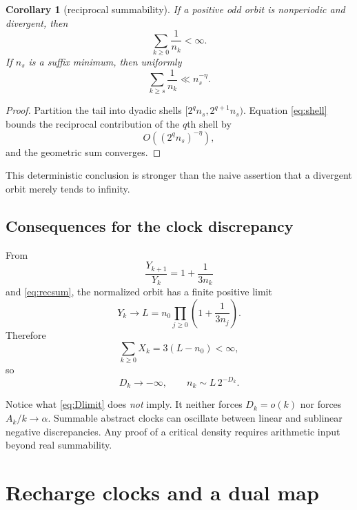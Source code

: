 \documentclass[11pt,reqno]{amsart}
\theoremstyle{plain}
\newtheorem{corollary}[theorem]{Corollary}
\theoremstyle{definition}
\numberwithin{equation}{section}
\begin{document}
\begin{corollary}[reciprocal summability]
\label{cor:reciprocal}
If a positive odd orbit is nonperiodic and divergent, then
\begin{equation}\label{eq:recsum}
\sum_{k\ge0}\frac1{n_k}<\infty.
\end{equation}
If $n_s$ is a suffix minimum, then uniformly
\begin{equation}\label{eq:recsuffix}
\sum_{k\ge s}\frac1{n_k}\ll n_s^{-\eta}.
\end{equation}
\end{corollary}

\begin{proof}
Partition the tail into dyadic shells $[2^qn_s,2^{q+1}n_s)$.  Equation
\eqref{eq:shell} bounds the reciprocal contribution of the $q$th shell by
\[
O\!\left((2^qn_s)^{-\eta}\right),
\]
and the geometric sum converges.
\end{proof}

This deterministic conclusion is stronger than the naive assertion that a
divergent orbit merely tends to infinity.

\subsection{Consequences for the clock discrepancy}

From
\[
\frac{Y_{k+1}}{Y_k}=1+\frac1{3n_k}
\]
and \eqref{eq:recsum}, the normalized orbit has a finite positive limit
\begin{equation}\label{eq:Ylimit}
Y_k\longrightarrow L
=n_0\prod_{j\ge0}\left(1+\frac1{3n_j}\right).
\end{equation}
Therefore
\begin{equation}\label{eq:Xsum}
\sum_{k\ge0}X_k=3(L-n_0)<\infty,
\end{equation}
so
\begin{equation}\label{eq:Dlimit}
D_k\to-\infty,
\qquad
n_k\sim L\,2^{-D_k}.
\end{equation}

Notice what \eqref{eq:Dlimit} does \emph{not} imply.  It neither forces
$D_k=o(k)$ nor forces $A_k/k\to\alpha$.  Summable abstract clocks can
oscillate between linear and sublinear negative discrepancies.  Any proof of a
critical density requires arithmetic input beyond real summability.

\section{Recharge clocks and a dual map}
\label{sec:recharge}
\end{document}
